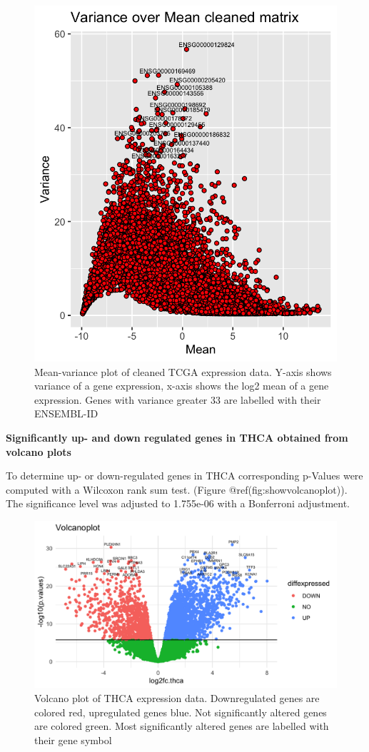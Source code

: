 \documentclass[
  parskip,
  oneside]{scrreprt}
\begin{document}
\begin{figure}

{\centering \includegraphics[width=0.65\linewidth]{figures/Variance_over mean_cleaned_matrix} 

}

\caption{Mean-variance plot of cleaned TCGA expression data. Y-axis shows variance of a gene expression, x-axis shows the log2 mean of a gene expression. Genes with variance greater 33 are labelled with their ENSEMBL-ID}\label{fig:showmeanvariance}
\end{figure}

\textbf{Significantly up- and down regulated genes in THCA obtained from
volcano plots}

To determine up- or down-regulated genes in THCA corresponding p-Values
were computed with a Wilcoxon rank sum test. (Figure
@ref(fig:showvolcanoplot)). The significance level was adjusted to
1.755e-06 with a Bonferroni adjustment.

\begin{figure}

{\centering \includegraphics[width=1\linewidth]{figures/Volcanoplot} 

}

\caption{Volcano plot of THCA expression data. Downregulated genes are colored red, upregulated genes blue. Not significantly altered genes are colored green. Most significantly altered genes are labelled with their gene symbol}\label{fig:showvolcanoplot}
\end{figure}
\end{document}
